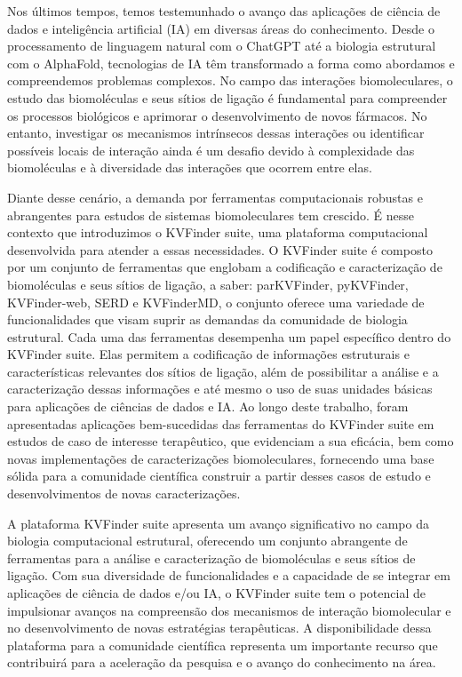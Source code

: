 \documentclass[Portugues]{phdquali}
\begin{document}
\begin{resumo}

Nos últimos tempos, temos testemunhado o avanço das aplicações de ciência de dados e inteligência artificial (IA) em diversas áreas do conhecimento. Desde o processamento de linguagem natural com o ChatGPT até a biologia estrutural com o AlphaFold, tecnologias de IA têm transformado a forma como abordamos e compreendemos problemas complexos. No campo das interações biomoleculares, o estudo das biomoléculas e seus sítios de ligação é fundamental para compreender os processos biológicos e aprimorar o desenvolvimento de novos fármacos. No entanto, investigar os mecanismos intrínsecos dessas interações ou identificar possíveis locais de interação ainda é um desafio devido à complexidade das biomoléculas e à diversidade das interações que ocorrem entre elas. 

Diante desse cenário, a demanda por ferramentas computacionais robustas e abrangentes para estudos de sistemas biomoleculares tem crescido. É nesse contexto que introduzimos o KVFinder suite, uma plataforma computacional desenvolvida para atender a essas necessidades. O KVFinder suite é composto por um conjunto de ferramentas que englobam a codificação e caracterização de biomoléculas e seus sítios de ligação, a saber: parKVFinder, pyKVFinder, KVFinder-web, SERD e KVFinderMD, o conjunto oferece uma variedade de funcionalidades que visam suprir as demandas da comunidade de biologia estrutural. Cada uma das ferramentas desempenha um papel específico dentro do KVFinder suite. Elas permitem a codificação de informações estruturais e características relevantes dos sítios de ligação, além de possibilitar a análise e a caracterização dessas informações e até mesmo o uso de suas unidades básicas para aplicações de ciências de dados e IA. Ao longo deste trabalho, foram apresentadas aplicações bem-sucedidas das ferramentas do KVFinder suite em estudos de caso de interesse terapêutico, que evidenciam a sua eficácia, bem como novas implementações de caracterizações biomoleculares, fornecendo uma base sólida para a comunidade científica construir a partir desses casos de estudo e desenvolvimentos de novas caracterizações.

A plataforma KVFinder suite apresenta um avanço significativo no campo da biologia computacional estrutural, oferecendo um conjunto abrangente de ferramentas para a análise e caracterização de biomoléculas e seus sítios de ligação. Com sua diversidade de funcionalidades e a capacidade de se integrar em aplicações de ciência de dados e/ou IA, o KVFinder suite tem o potencial de impulsionar avanços na compreensão dos mecanismos de interação biomolecular e no desenvolvimento de novas estratégias terapêuticas. A disponibilidade dessa plataforma para a comunidade científica representa um importante recurso que contribuirá para a aceleração da pesquisa e o avanço do conhecimento na área.

\end{resumo}
\end{document}
